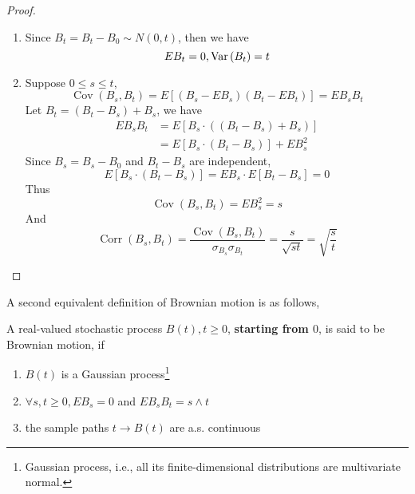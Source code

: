\begin{proof}
	\begin{enumerate}
		\item Since $B_{t}=B_{t}-B_{0}\sim N(0, t)$, then we have
		      \begin{equation*}
			      EB_{t}=0,\mathrm{Var}\left(B_{t}\right)=t
		      \end{equation*}
		\item Suppose $0\leq s\leq t$,
		      \begin{equation*}
			      \operatorname{Cov}\left(B_{s}, B_{t}\right)=E\left[\left(B_{s}-EB_{s}\right)\left(B_{t}-EB_{t}\right)\right]=EB_{s}B_{t}
		      \end{equation*}
		      Let $B_{t}=\left(B_{t}-B_{s}\right)+B_{s}$, we have
		      \begin{equation*}
			      \begin{aligned}
				      EB_{s}B_{t} & =E\left[B_{s}\cdot\left(\left(B_{t}-B_{s}\right)+B_{s}\right)\right] \\
				                  & =E\left[B_{s}\cdot\left(B_{t}-B_{s}\right)\right]+EB_{s}^{2}
			      \end{aligned}
		      \end{equation*}
		      Since $B_{s}=B_{s}-B_{0}$ and $B_{t}-B_{s}$ are independent,
		      \begin{equation*}
			      E\left[B_{s} \cdot\left(B_{t}-B_{s}\right)\right]=EB_{s} \cdot E\left[B_{t}-B_{s}\right]=0
		      \end{equation*}
		      Thus
		      \begin{equation*}
			      \operatorname{Cov}\left(B_{s}, B_{t}\right)=EB_{s}^{2}=s
		      \end{equation*}
		      And
		      \begin{equation*}
			      \operatorname{Corr}\left(B_{s},B_{t}\right)=\frac{\operatorname{Cov}\left(B_{s},B_{t}\right)}{\sigma_{B_{s}}\sigma_{B_{t}}}=\frac{s}{\sqrt{st}}=\sqrt{\frac{s}{t}}
		      \end{equation*}
	\end{enumerate}
\end{proof}

A second equivalent definition of Brownian motion is as follows,

\begin{definition}
	A real-valued stochastic process $B(t),t\geq 0$, \textbf{starting from $0$}, is said to be Brownian motion, if
	\begin{enumerate}
		\item $B(t)$ is a Gaussian process\footnote{Gaussian process, i.e., all its finite-dimensional distributions are multivariate normal.}
		\item $\forall s,t\geq 0,EB_{s}=0$ and $EB_{s}B_{t}=s\wedge t$
		\item the sample paths $t\rightarrow B(t)$ are a.s. continuous
	\end{enumerate}
\end{definition}

